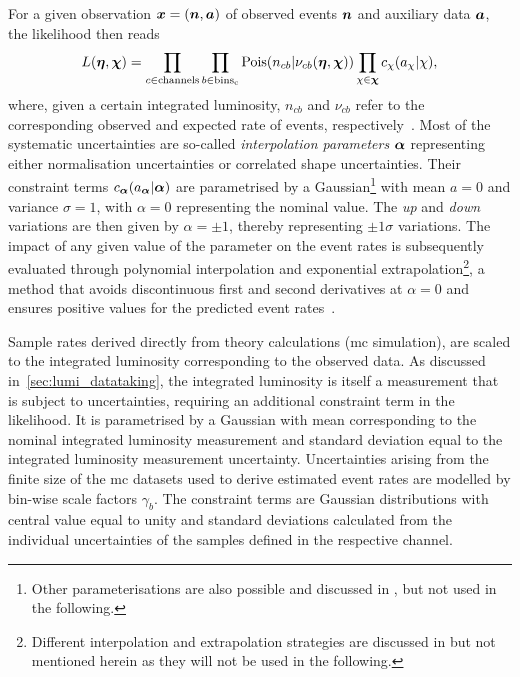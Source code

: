 For a given observation $\makemebold{x} = (\makemebold{n},\makemebold{a})$ of observed events $\makemebold{n}$ and auxiliary data $\makemebold{a}$, the likelihood then reads
\begin{equation}
	L (\makemebold{\eta}, \makemebold{\chi}) = \prod_{c\in\mathrm{channels}} \prod_{b\in\mathrm{bins_c}} \mathrm{Pois}(n_{cb}\vert\nu_{cb}(\makemebold{\eta},\makemebold{\chi})) \prod_{\chi\in\makemebold{\chi}}c_\chi (a_\chi\vert\chi),
\end{equation}
where, given a certain integrated luminosity, $n_{cb}$ and $\nu_{cb}$ refer to the corresponding observed and expected rate of events, respectively~\cite{ATL-PHYS-PUB-2019-029}.
Most of the systematic uncertainties are so-called \textit{interpolation parameters} $\makemebold{\alpha}$ representing either normalisation uncertainties or correlated shape uncertainties.
Their constraint terms $c_{\makemebold{\alpha}}(a_{\makemebold{\alpha}}\vert\makemebold{\alpha})$ are parametrised by a Gaussian\footnote{Other parameterisations are also possible and discussed in \cite{Cranmer:1456844}, but not used in the following.} with mean $a = 0$ and variance $\sigma = 1$, with $\alpha = 0$ representing the nominal value.
The \textit{up} and \textit{down} variations are then given by $\alpha=\pm 1$, thereby representing $\pm 1\sigma$ variations.
The impact of any given value of the parameter on the event rates is subsequently evaluated through polynomial interpolation and exponential extrapolation\footnote{Different interpolation and extrapolation strategies are discussed in \cite{Cranmer:1456844} but not mentioned herein as they will not be used in the following.}, a method that avoids discontinuous first and second derivatives at $\alpha = 0$ and ensures positive values for the predicted event rates~\cite{Cranmer:1456844}.

Sample rates derived directly from theory calculations (\ie \gls{mc} simulation), are scaled to the integrated luminosity corresponding to the observed data.
As discussed in~\cref{sec:lumi_datataking}, the integrated luminosity is itself a measurement that is subject to uncertainties, requiring an additional constraint term in the likelihood.
It is parametrised by a Gaussian with mean corresponding to the nominal integrated luminosity measurement and standard deviation equal to the integrated luminosity measurement uncertainty.
Uncertainties arising from the finite size of the \gls{mc} datasets used to derive estimated event rates are modelled by bin-wise scale factors $\gamma_b$.
The constraint terms are Gaussian distributions with central value equal to unity and standard deviations calculated from the individual uncertainties of the samples defined in the respective channel.

